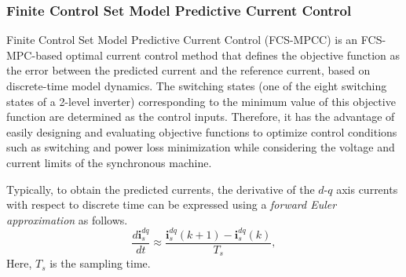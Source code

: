 \subsubsection{Finite Control Set Model Predictive Current Control} \label{sec2:2-2}
Finite Control Set Model Predictive Current Control (FCS-MPCC) is an FCS-MPC-based optimal current control method that defines the objective function as the error between the predicted current and the reference current, based on discrete-time model dynamics. The switching states (one of the eight switching states of a 2-level inverter) corresponding to the minimum value of this objective function are determined as the control inputs. Therefore, it has the advantage of easily designing and evaluating objective functions to optimize control conditions such as switching and power loss minimization while considering the voltage and current limits of the synchronous machine.

Typically, to obtain the predicted currents, the derivative of the $d$-$q$ axis currents with respect to discrete time can be expressed using a \emph{forward Euler approximation} \cite{c2.2_3} as follows.
\begin{equation}\label{eqn:2.15}
\frac{d\mathbf{i}^{dq}_s}{dt} \approx \frac{\mathbf{i}^{dq}_s(k+1) - \mathbf{i}^{dq}_s(k)}{T_s},
\end{equation}
Here, \( T_s \) is the sampling time. 

